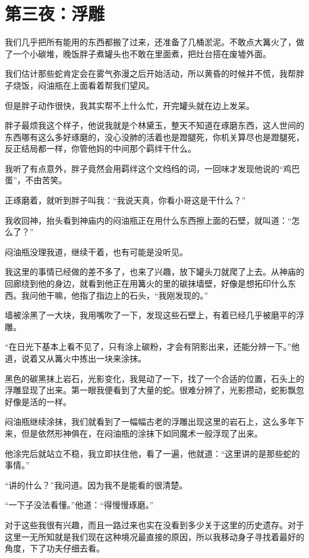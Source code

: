 \chapter{第三夜：浮雕}

我们几乎把所有能用的东西都搬了过来，还准备了几桶淤泥。不敢点大篝火了，做了一个小碳堆，晚饭胖子煮罐头也不敢在里面煮，把灶台搭在废墟外面。

我们估计那些蛇肯定会在雾气弥漫之后开始活动，所以黄昏的时候并不慌，我帮胖子烧饭，闷油瓶在上面看着帮我们望风。

但是胖子动作很快，我其实帮不上什么忙，开完罐头就在边上发呆。

胖子最烦我这个样子，他说我就是个林黛玉，整天不知道在琢磨东西，这人世间的东西哪有这么多好琢磨的，没心没肺的活着也是蹬腿死，你机关算尽也是蹬腿死，反正结局都一样，你管他妈的中间那个羁绊干什么。

我听了有点意外，胖子竟然会用羁绊这个文绉绉的词，一回味才发现他说的“鸡巴蛋”，不由苦笑。

正琢磨着，就听到胖子叫我：“我说天真，你看小哥这是干什么？”

我收回神，抬头看到神庙内的闷油瓶正在用什么东西擦上面的石壁，就叫道：“怎么了？”

闷油瓶没理我道，继续干着，也有可能是没听见。

我这里的事情已经做的差不多了，也来了兴趣，放下罐头刀就爬了上去。从神庙的回廊绕到他的身边，就看到他正在用篝火的里的碳抹墙壁，好像是想拓印什么东西。我问他干嘛，他指了指边上的石头，“我刚发现的。”

墙被涂黑了一大块，我用嘴吹了一下，发现这些石壁上，有着已经几乎被磨平的浮雕。

“在日光下基本上看不见了，只有涂上碳粉，才会有阴影出来，还能分辨一下。”他道，说着又从篝火中拣出一块来涂抹。

黑色的碳黑抹上岩石，光影变化，我晃动了一下，找了一个合适的位置，石头上的浮雕显现了出来。第一眼我便看到了大量的蛇。很难分辨了，光影攒动，蛇影飘忽好像是活的一样。

闷油瓶继续涂抹，我们就看到了一幅幅古老的浮雕出现这里的岩石上，这么多年下来，但是依然形神俱在，在闷油瓶的涂抹下如同魔术一般浮现了出来。

他涂完后就站立不稳，我立即扶住他，看了一遍，他就道：“这里讲的是那些蛇的事情。”

“讲的什么？”我问道。因为我不是能看的很清楚。

“一下子没法看懂。”他道：“得慢慢琢磨。”

对于这些我很有兴趣，而且一路过来也实在没看到多少关于这里的历史遗存。对于这里一无所知就是我们现在这种境况最直接的原因，所以我移动身子寻找着最好的角度，下了功夫仔细去看。

